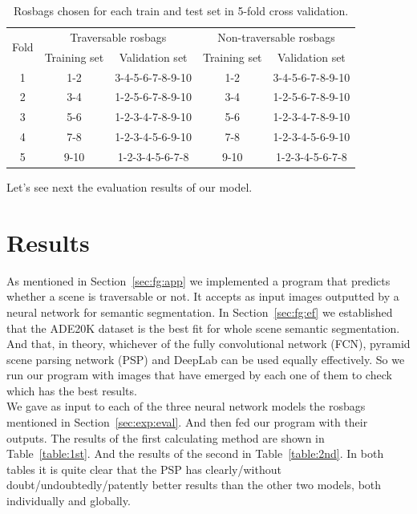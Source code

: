 \documentclass[12pt,a4paper]{report}
\newcommand{\acronym}{\MakeUppercase}
\begin{document}
	\begin{table}[h!]
		\centering
		\begin{tabular}{|c|c|c|c|c|}
			\hline
			\multirow{2}{*}{Fold} & \multicolumn{2}{|c|}{Traversable rosbags} & 
			\multicolumn{2}{|c|}{Non-traversable rosbags}\\
			& Training set & Validation set & Training set & Validation set\\
			\hline\hline
			1 & 1-2 & 3-4-5-6-7-8-9-10 & 1-2 & 3-4-5-6-7-8-9-10\\
			\hline
			2 & 3-4 & 1-2-5-6-7-8-9-10 & 3-4 & 1-2-5-6-7-8-9-10\\
			\hline
			3 & 5-6 & 1-2-3-4-7-8-9-10 & 5-6 & 1-2-3-4-7-8-9-10\\
			\hline
			4 & 7-8 & 1-2-3-4-5-6-9-10 & 7-8 & 1-2-3-4-5-6-9-10\\
			\hline
			5 & 9-10 & 1-2-3-4-5-6-7-8 & 9-10 & 1-2-3-4-5-6-7-8\\
			\hline
		\end{tabular}
		\caption{Rosbags chosen for each train and test set in 5-fold cross validation.}
		\label{table:folds}
	\end{table}
	
	Let's see next the evaluation results of our model. 
	\\
	
	
	\section{Results}
	\label{sec:exp:res}
	
	As mentioned in Section~\ref{sec:fg:app} we implemented a program that predicts whether 
	a scene is traversable or not. It accepts as input images outputted by a neural network 
	for semantic segmentation. In Section~\ref{sec:fg:ef} we established that the 
	\acronym{ade20k} dataset is the best fit for whole scene semantic segmentation. And that, 
	in theory, whichever of the fully convolutional network (\acronym{fcn}), pyramid scene 
	parsing network (\acronym{psp}) and DeepLab can be used equally effectively. So we run 
	our program with images that have emerged by each one of them to check which has the 
	best results.
	\\
	
	We gave as input to each of the three neural network models the rosbags mentioned in 
	Section~\ref{sec:exp:eval}. And then fed our program with their outputs. The results of 
	the first calculating method are shown in Table~\ref{table:1st}. And the results of the 
	second in Table~\ref{table:2nd}. In both tables it is quite clear that the PSP has clearly/without doubt/undoubtedly/patently 
	better results than the other two models, both individually and globally.
	\\
	
\end{document}
